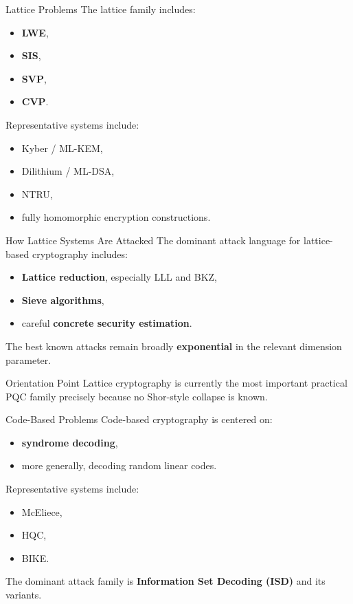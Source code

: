 \documentclass[aspectratio=169]{beamer}
\begin{document}
	\begin{frame}{Lattice Problems}
		The lattice family includes:
		\begin{itemize}
			\item \textbf{LWE},
			\item \textbf{SIS},
			\item \textbf{SVP},
			\item \textbf{CVP}.
		\end{itemize}
		
		Representative systems include:
		\begin{itemize}
			\item Kyber / ML-KEM,
			\item Dilithium / ML-DSA,
			\item NTRU,
			\item fully homomorphic encryption constructions.
		\end{itemize}
	\end{frame}
	
	\begin{frame}{How Lattice Systems Are Attacked}
		The dominant attack language for lattice-based cryptography includes:
		\begin{itemize}
			\item \textbf{Lattice reduction}, especially LLL and BKZ,
			\item \textbf{Sieve algorithms},
			\item careful \textbf{concrete security estimation}.
		\end{itemize}
		
		\vspace{0.5em}
		The best known attacks remain broadly \textbf{exponential} in the relevant dimension parameter.
		
		\begin{block}{Orientation Point}
			Lattice cryptography is currently the most important practical PQC family precisely because no Shor-style collapse is known.
		\end{block}
	\end{frame}
	
	\begin{frame}{Code-Based Problems}
		Code-based cryptography is centered on:
		\begin{itemize}
			\item \textbf{syndrome decoding},
			\item more generally, decoding random linear codes.
		\end{itemize}
		
		Representative systems include:
		\begin{itemize}
			\item McEliece,
			\item HQC,
			\item BIKE.
		\end{itemize}
		
		The dominant attack family is \textbf{Information Set Decoding (ISD)} and its variants.
	\end{frame}
	
\end{document}
